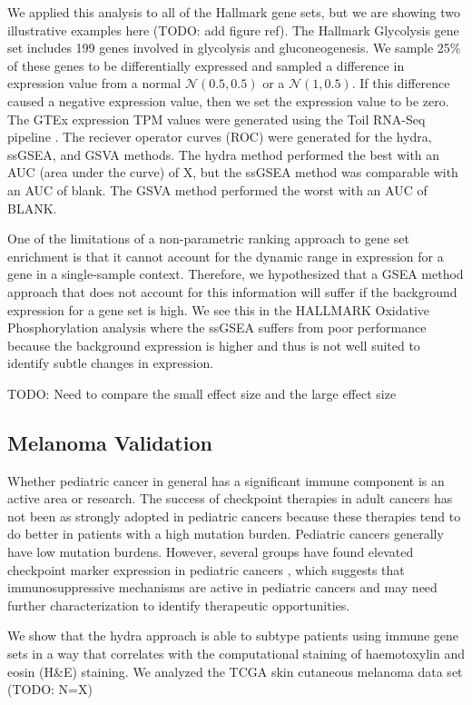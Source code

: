\documentclass[fleqn,10pt]{wlscirep}
\begin{document}
We applied this analysis to all of the Hallmark gene sets, but we are showing two illustrative examples here (TODO: add figure ref). The Hallmark Glycolysis gene set includes 
199 genes involved in glycolysis and gluconeogenesis. We sample 25\% of these genes to be differentially expressed and sampled a difference in expression value from a normal $\mathcal{N}(0.5, 0.5)$ or a $\mathcal{N}(1, 0.5)$. If this difference caused a negative expression value, then we set the expression value to be zero. The GTEx expression TPM values were generated using the Toil RNA-Seq pipeline \cite{vivian2017toil}. The reciever operator curves (ROC) were generated for the hydra, ssGSEA, and GSVA methods. The hydra method performed the best with an AUC (area under the curve) of X, but the ssGSEA method was comparable with an AUC of blank. The GSVA method performed the worst with an AUC of BLANK. 

One of the limitations of a non-parametric ranking approach to gene set enrichment is that it cannot account for the dynamic range in expression for a gene in a single-sample context. Therefore, we hypothesized that a GSEA method approach that does not account for this information will suffer if the background expression for a gene set is high. We see this in the HALLMARK Oxidative Phosphorylation analysis where the ssGSEA suffers from poor performance because the background expression is higher and thus is not well suited to identify subtle changes in expression.

TODO: Need to compare the small effect size and the large effect size 

\subsection*{Melanoma Validation}
Whether pediatric cancer in general has a significant immune component is an active area or research. The success of checkpoint therapies in adult cancers has not been as strongly adopted in pediatric cancers because these therapies tend to do better in patients with a high mutation burden. Pediatric cancers generally have low mutation burdens. However, several groups have found elevated checkpoint marker expression in pediatric cancers \cite{majzner2017assessment,saletta2017programmed,nowicki2016prospective}, which suggests that immunosuppressive mechanisms are active in pediatric cancers and may need further characterization to identify therapeutic opportunities. 

We show that the hydra approach is able to subtype patients using immune gene sets in a way that correlates with the computational staining of haemotoxylin and eosin (H\&E) staining. We analyzed the TCGA skin cutaneous melanoma data set (TODO: N=X) 
\end{document}
